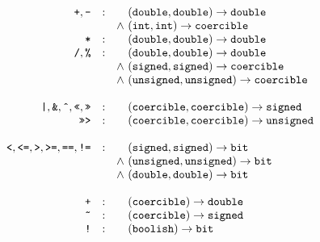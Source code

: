 \documentclass{article}
\newcommand{\funty}[2]{({#1}) \rightarrow {#2}}
\newcommand{\mathjs}[1]{\mbox{\texttt{{#1}}}}
\newcommand{\ok}{\mathrm{\mathbf{ok}}}
\newcommand{\fjudge}[3]{{#1};{#2} \vdash {#3}\ \ok}
\newcommand{\bit}{\mathtt{bit}}
\newcommand{\unsigned}{\mathtt{unsigned}}
\newcommand{\signed}{\mathtt{signed}}
\newcommand{\double}{\mathtt{double}}
\renewcommand{\int}{\mathtt{int}}
\newcommand{\boolish}{\mathtt{boolish}}
\newcommand{\coercible}{\mathtt{coercible}}
\begin{document}
\[
\begin{array}{rcc@{\ }l}
\mathjs{+}, \mathjs{-}
                 & : &       & \funty{\double, \double}{\double} \\
                 &   & \land & \funty{\int, \int}{\coercible} \\
\mathjs{*}       & : &       & \funty{\double, \double}{\double} \\
\mathjs{/}, \mathjs{\%}
                 & : &       & \funty{\double, \double}{\double} \\
                 &   & \land & \funty{\signed, \signed}{\coercible}  \\
                 &   & \land & \funty{\unsigned, \unsigned}{\coercible} \\
\\
\mathjs{|}, \mathjs{\&}, \mathjs{\^{}}, \mathjs{<<}, \mathjs{>>}
                 & : &       & \funty{\coercible, \coercible}{\signed} \\
\mathjs{>>>}     & : &       & \funty{\coercible, \coercible}{\unsigned} \\
\\
\mathjs{<}, \mathjs{<=}, \mathjs{>}, \mathjs{>=}, \mathjs{==}, \mathjs{!=}
                 & : &       & \funty{\signed, \signed}{\bit} \\
                 &   & \land & \funty{\unsigned, \unsigned}{\bit} \\
                 &   & \land & \funty{\double, \double}{\bit} \\
\\
\mathjs{+}       & : &       & \funty{\coercible}{\double} \\
\mathjs{\~{}}    & : &       & \funty{\coercible}{\signed} \\
\mathjs{!}       & : &       & \funty{\boolish}{\bit} \\
\end{array}
\]

\newcommand{\Pjudge}[1]{\vdash {#1}\ \ok}
\newcommand{\impjudge}[4]{{#1};{#2};{#3} \vdash {#4}\ \ok}
\newcommand{\fnjudge}[2]{{#1} \vdash {#2}\ \ok}
\newcommand{\expjudge}[2]{{#1} \vdash {#2}\ \ok}
\newcommand{\stmtjudge}[5]{{#1};{#2} \vdash {#3} : {#4} / {#5}}
\newcommand{\exprjudge}[3]{{#1} \vdash {#2} : {#3}}
\newcommand{\notexprjudge}[3]{{#1} \not\vdash {#2} : {#3}}
\newcommand{\casejudge}[6]{{#1};{#2} \vdash {#3} : {#4}, {#5} / {#6}}
\end{document}
